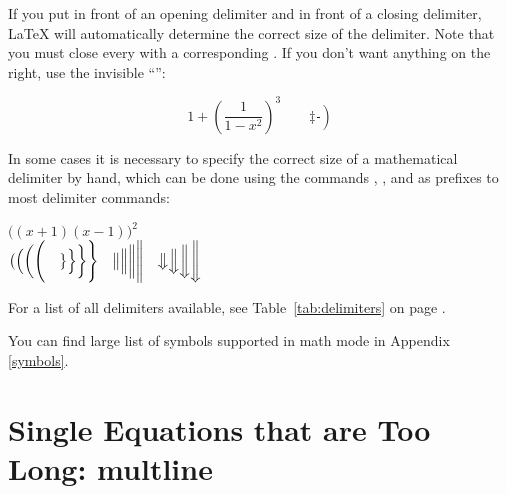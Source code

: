 If you put  in front of an opening delimiter and
 in front of a closing delimiter, \LaTeX{} will automatically
determine the correct size of the delimiter. Note that you must close
every  with a corresponding . If you
don't want anything on the right, use the invisible ``'':
\begin{example}
\begin{equation*}
1 + \left(\frac{1}{1-x^{2}}
    \right)^3 \qquad 
\left. \ddagger \frac{~}{~}\right)
\end{equation*}
\end{example}

In some cases it is necessary to specify the correct size of a
mathematical delimiter by hand,
which can be done using the commands , ,  and
 as prefixes to most delimiter commands:
\begin{example}
$\Big((x+1)(x-1)\Big)^{2}$\\
$\big( \Big( \bigg( \Bigg( \quad
\big\} \Big\} \bigg\} \Bigg\} \quad
\big\| \Big\| \bigg\| \Bigg\| \quad
\big\Downarrow \Big\Downarrow 
\bigg\Downarrow \Bigg\Downarrow$
\end{example}
 For a list of all delimiters available, see Table~\ref{tab:delimiters} on page
\pageref{tab:delimiters}. 

You can find large list of symbols supported in math mode in
Appendix \ref{symbols}.

\section{Single Equations that are Too Long: multline}
\label{sec:multline}

